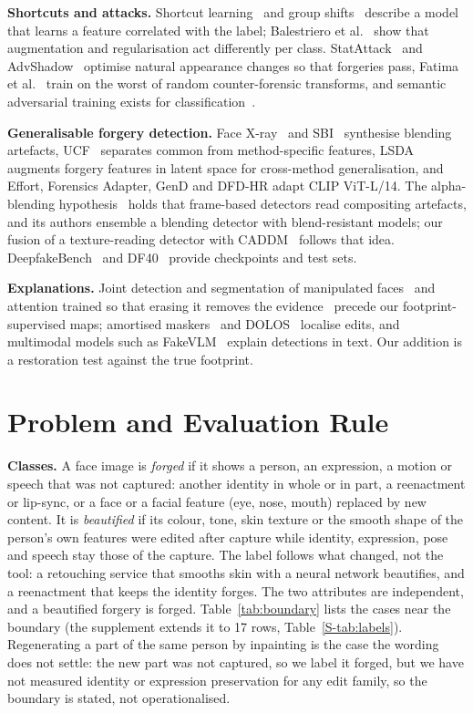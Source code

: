 \documentclass[conference]{IEEEtran}
\begin{document}
\textbf{Shortcuts and attacks.} Shortcut learning~\cite{geirhos2020} and group shifts~\cite{sagawa2020} describe a model that
learns a feature correlated with the label; Balestriero et al.~\cite{balestriero2022} show that augmentation and regularisation
act differently per class. StatAttack~\cite{statattack2023} and AdvShadow~\cite{advshadow2024} optimise natural appearance
changes so that forgeries pass, Fatima et al.~\cite{fatima2025} train on the worst of random counter-forensic transforms, and
semantic adversarial training exists for classification~\cite{hosseini2018,laidlaw2019,gat2023,ava2021}.

\textbf{Generalisable forgery detection.} Face X-ray~\cite{facexray} and SBI~\cite{sbi} synthesise blending artefacts,
UCF~\cite{ucf} separates common from method-specific features, LSDA~\cite{lsda} augments forgery features in latent space for
cross-method generalisation, and Effort, Forensics Adapter, GenD and DFD-HR adapt CLIP ViT-L/14. The alpha-blending
hypothesis~\cite{alphablend2026} holds that frame-based detectors read compositing artefacts, and its authors ensemble a
blending detector with blend-resistant models; our fusion of a texture-reading detector with CADDM~\cite{caddm} follows that
idea. DeepfakeBench~\cite{deepfakebench} and DF40~\cite{df40} provide checkpoints and test sets.

\textbf{Explanations.} Joint detection and segmentation of manipulated faces~\cite{nguyen2019multitask,hifinet2023} and
attention trained so that erasing it removes the evidence~\cite{gain} precede our footprint-supervised maps; amortised
maskers~\cite{dabkowski2017,phang2020} and DOLOS~\cite{dolos} localise edits, and multimodal models such as
FakeVLM~\cite{fakevlm2025} explain detections in text. Our addition is a restoration test against the true footprint.

\section{Problem and Evaluation Rule}
\label{sec:protocol}
\textbf{Classes.} A face image is \emph{forged} if it shows a person, an expression, a motion or speech that was not captured:
another identity in whole or in part, a reenactment or lip-sync, or a face or a facial feature (eye, nose, mouth) replaced by
new content. It
is \emph{beautified} if its colour, tone, skin texture or the smooth shape of the person's own features were edited after
capture while identity, expression, pose and speech stay those of the capture. The label follows what changed, not the tool: a
retouching service that smooths skin with a neural network beautifies, and a reenactment that keeps the identity forges. The
two attributes are independent, and a beautified forgery is forged. Table~\ref{tab:boundary} lists the cases near the boundary
(the supplement extends it to 17 rows, Table~\ref{S-tab:labels}). Regenerating a part of the same person by inpainting is the
case the wording does not settle: the new part was not captured, so we label it forged, but we have not measured identity or
expression preservation for any edit family, so the boundary is stated, not operationalised.
\end{document}
